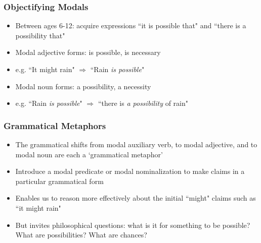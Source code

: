 \begin{frame}
\frametitle{Objectifying Modals}

\begin{itemize}[<+->]

\item Between ages 6-12: acquire expressions ``it is possible that" and ``there is a possibility that" 

\item Modal adjective forms: is possible, is necessary

\item[] e.g. ``It might rain" $\Rightarrow$ ``Rain \textit{is possible}"

\item Modal noun forms: a possibility, a necessity

\item[] e.g. ``Rain \textit{is possible}" $\Rightarrow$ ``there is \textit{a possibility} of rain"


\end{itemize}
\end{frame}

\begin{frame}
\frametitle{Grammatical Metaphors}

\begin{itemize}[<+->]

\item The grammatical shifts from modal auxiliary verb, to modal adjective, and to modal noun are each a `grammatical metaphor'

\item Introduce a modal predicate or modal nominalization to make claims in a particular grammatical form

\item Enables us to reason more effectively about the initial ``might" claims such as ``it might rain"

\item But invites philosophical questions: what is it for something to be possible? What are possibilities? What are chances?

\end{itemize}
\end{frame}


